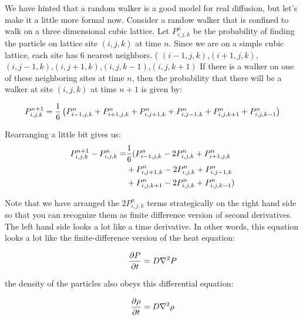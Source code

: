 We have hinted that a random walker is a good model for real
diffusion, but let's make it a little more formal now.  Consider a
randow walker that is confined to walk on a three dimensional cubic
lattice. Let $P_{i,j,k}^n$ be the probability of finding the
particle on lattice site $(i,j,k)$ at time $n$.   Since we are on a
simple cubic lattice, each site has $6$ nearest neighbors. (
$(i-1,j,k)$,$(i+1,j,k)$,$(i,j-1,k)$,$(i,j+1,k)$,$(i,j,k-1)$,$(i,j,k+1)$
If there is a walker on one of these neighboring sites at time $n$, then the
probability that there will be a walker at site $(i,j,k)$ at time $n+1$ is
given by:

\begin{equation}
P_{i,j,k}^{n+1} = {1\over 6} \left( P_{i-1,j,k}^n +
  P_{i+1,j,k}^n + P_{i,j+1,k}^n + P_{i,j-1,k}^n +
P_{i,j,k+1}^n + P_{i,j,k-1}^n\right)
\end{equation} 

Rearranging a little bit gives us:
\begin{align}
P_{i,j,k}^{n+1} - P_{i,j,k}^n = &{1\over 6} (  P_{i-1,j,k}^n - 2 P_{i,j,k}^n +  P_{i+1,j,k}^n\\
&+ P_{i,j+1,k}^n - 2 P_{i,j,k}^n+ P_{i,j-1,k}^n\\
& +P_{i,j,k+1}^n - 2 P_{i,j,k}^n + P_{i,j,k-1}^n )\\
\end{align} 

Note that we have arranged the $2 P_{i,j,k}^n$ terms 
strategically on the right hand side so that you can recognize them as
finite difference version of second derivatives.  The left hand side
looks a lot like a time derivative.  In other words, this equation
looks a lot like the finite-difference version of the heat equation:

\begin{equation}
{\partial P \over \partial t} = D \nabla^2 P
\end{equation}

the density of the particles also obeys this differential equation:

\begin{equation}
{\partial \rho \over \partial t} = D \nabla^2 \rho
\end{equation}


